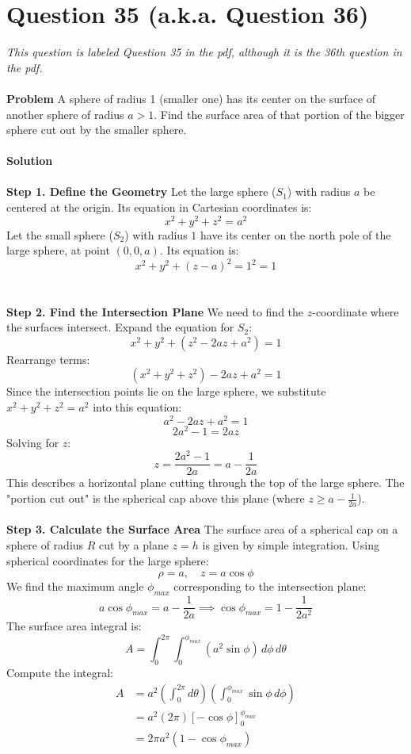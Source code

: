 \documentclass{article}
\begin{document}
\section{Question 35 (a.k.a. Question 36)}
\textit{\small{This question is labeled Question 35 in the pdf, although it is
		the 36th question in the pdf.}}
\\
\\
\textbf{Problem}
A sphere of radius 1 (smaller one) has its center on the surface of another
sphere of radius $a > 1$. Find the surface area of that portion of the bigger
sphere cut out by the smaller sphere.
\\
\\
\textbf{Solution}
\\
\\
\textbf{Step 1. Define the Geometry}
Let the large sphere ($S_1$) with radius $a$ be centered at the origin. Its
equation in Cartesian coordinates is:
\[ x^2 + y^2 + z^2 = a^2 \]
Let the small sphere ($S_2$) with radius $1$ have its center on the north pole
of the large sphere, at point $(0,0,a)$. Its equation is:
\[ x^2 + y^2 + (z - a)^2 = 1^2 = 1 \]
\\
\\
\textbf{Step 2. Find the Intersection Plane}
We need to find the $z$-coordinate where the surfaces intersect. Expand the
equation for $S_2$:
\[ x^2 + y^2 + (z^2 - 2az + a^2) = 1 \]
Rearrange terms:
\[ (x^2 + y^2 + z^2) - 2az + a^2 = 1 \]
Since the intersection points lie on the large sphere, we substitute
$x^2 + y^2 + z^2 = a^2$ into this equation:
\[ a^2 - 2az + a^2 = 1 \]
\[ 2a^2 - 1 = 2az \]
Solving for $z$:
\[ z = \frac{2a^2 - 1}{2a} = a - \frac{1}{2a} \]
This describes a horizontal plane cutting through the top of the large sphere.
The "portion cut out" is the spherical cap above this plane (where
$z \ge a - \frac{1}{2a}$).
\\
\\
\textbf{Step 3. Calculate the Surface Area}
The surface area of a spherical cap on a sphere of radius $R$ cut by a plane
$z=h$ is given by simple integration. Using spherical coordinates for the large
sphere:
\[ \rho = a, \quad z = a\cos\phi \]
We find the maximum angle $\phi_{max}$ corresponding to the intersection plane:
\[ a\cos\phi_{max} = a - \frac{1}{2a} \implies \cos\phi_{max} = 1 - \frac{1}{2a^2} \]
The surface area integral is:
\[ A = \int_0^{2\pi} \int_0^{\phi_{max}} (a^2 \sin\phi) \, d\phi \, d\theta \]
Compute the integral:
\begin{align*}
	A & = a^2 \left( \int_0^{2\pi} d\theta \right) \left( \int_0^{\phi_{max}} \sin\phi \, d\phi \right) \\
	  & = a^2 (2\pi) [-\cos\phi]_0^{\phi_{max}}                                                         \\
	  & = 2\pi a^2 (1 - \cos\phi_{max})
\end{align*}
\end{document}
